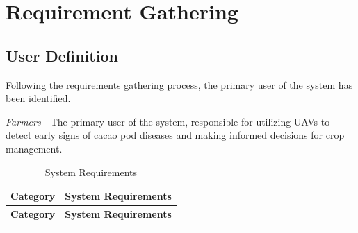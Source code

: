 	\section{Requirement Gathering}
	
	\subsection{User Definition} 
	
	Following the requirements gathering process, the primary user of the system has been identified. 
	
	\textit{Farmers} - The primary user of the system, responsible for utilizing UAVs to detect early signs of cacao pod diseases and making informed decisions for crop management.
	
  \begin{longtable}{p{4cm} p{8cm}}
    \caption{System Requirements} \label{tab:sysreq} \\
    \toprule
    \textbf{Category} & \textbf{System Requirements} \\
    \midrule
    \endfirsthead

    \toprule
    \textbf{Category} & \textbf{System Requirements} \\
    \midrule
    \endhead

    \bottomrule
    \endfoot


\end{longtable}
